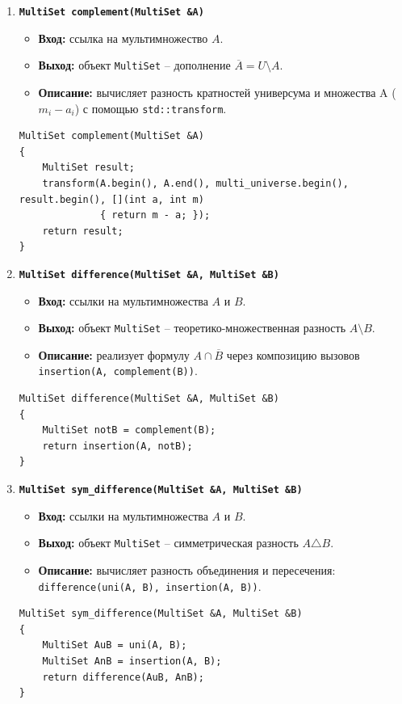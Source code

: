 \documentclass[14pt, a4paper]{extarticle}
\begin{document}
\begin{enumerate}[label=\arabic*., resume]
		\item \textbf{\texttt{MultiSet complement(MultiSet \&A)}}
		\begin{itemize}[leftmargin=*, noitemsep]
			\item \textbf{Вход:} ссылка на мультимножество $A$.
			\item \textbf{Выход:} объект \texttt{MultiSet} -- дополнение $\overline{A} = U \setminus A$.
			\item \textbf{Описание:} вычисляет разность кратностей универсума и множества A ($m_i - a_i$) с помощью \texttt{std::transform}.
		\end{itemize}
		\begin{lstlisting}[caption={Функция complement()}, label={lst:func_complement}]
MultiSet complement(MultiSet &A)
{
    MultiSet result;
    transform(A.begin(), A.end(), multi_universe.begin(), result.begin(), [](int a, int m)
              { return m - a; });
    return result;
}
		\end{lstlisting}
		
		\item \textbf{\texttt{MultiSet difference(MultiSet \&A, MultiSet \&B)}}
		\begin{itemize}[leftmargin=*, noitemsep]
			\item \textbf{Вход:} ссылки на мультимножества $A$ и $B$.
			\item \textbf{Выход:} объект \texttt{MultiSet} -- теоретико-множественная разность $A \setminus B$.
			\item \textbf{Описание:} реализует формулу $A \cap \overline{B}$ через композицию вызовов \texttt{insertion(A, complement(B))}.
		\end{itemize}
		\begin{lstlisting}[caption={Функция difference()}, label={lst:func_difference}]
MultiSet difference(MultiSet &A, MultiSet &B)
{
    MultiSet notB = complement(B);
    return insertion(A, notB);
}
		\end{lstlisting}
		
		\item \textbf{\texttt{MultiSet sym\_difference(MultiSet \&A, MultiSet \&B)}}
		\begin{itemize}[leftmargin=*, noitemsep]
			\item \textbf{Вход:} ссылки на мультимножества $A$ и $B$.
			\item \textbf{Выход:} объект \texttt{MultiSet} -- симметрическая разность $A \triangle B$.
			\item \textbf{Описание:} вычисляет разность объединения и пересечения: \\ \texttt{difference(uni(A, B), insertion(A, B))}.
		\end{itemize}
		\begin{lstlisting}[caption={Функция sym\_difference()}, label={lst:func_sym_difference}]
MultiSet sym_difference(MultiSet &A, MultiSet &B)
{
    MultiSet AuB = uni(A, B);
    MultiSet AnB = insertion(A, B);
    return difference(AuB, AnB);
}
		\end{lstlisting}
		

\end{enumerate}
\end{document}
